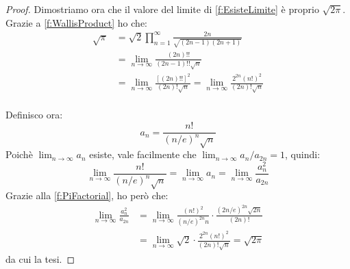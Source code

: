 \begin{proof}
	Dimostriamo ora che il valore del limite di \cref{f:EsisteLimite} è proprio $\sqrt{2\pi}$.
	Grazie a \cref{f:WallisProduct} ho che:
	\begin{equation}\label{f:PiFactorial}
	\begin{split}
		\sqrt{\pi}	& =\sqrt{2}\prod_{n=1}^\infty\frac{2n}{\sqrt{(2n-1)(2n+1)}}\\
					& =\lim_{n\to\infty}\frac{(2n)!!}{(2n-1)!!\sqrt{n}}\\
					& =\lim_{n\to\infty}\frac{\left[(2n)!!\right]^2}{(2n)!\sqrt{n}}=\lim_{n\to\infty}\frac{2^{2n}\left(n!\right)^2}{(2n)!\sqrt{n}}\\
	\end{split}
	\end{equation}
	
	Definisco ora:
	\begin{equation*}
		a_n=\frac{n!}{(n/e)^n\sqrt{n}}
	\end{equation*}
	Poichè $\lim_{n\to\infty}{a_n}$ esiste, vale facilmente che $\lim_{n\to\infty}a_n/a_{2n}=1$, quindi:
	\begin{equation*}
		\lim_{n\to\infty}{\frac{n!}{(n/e)^n\sqrt{n}}}=\lim_{n\to\infty}{a_n}=\lim_{n\to\infty}{\frac{a_n^2}{a_{2n}}}
	\end{equation*}
	Grazie alla \cref{f:PiFactorial}, ho però che:
	\begin{equation*}
	\begin{split}
		\lim_{n\to\infty}{\frac{a_n^2}{a_{2n}}}
		&=\lim_{n\to\infty}{\frac{\left(n!\right)^2}{(n/e)^{2n}n}\cdot \frac{(2n/e)^{2n}\sqrt{2n}}{(2n)!} }\\
		&=\lim_{n\to\infty}{\sqrt{2}\cdot\frac{2^{2n} \left(n!\right)^2}{(2n)!\sqrt{n}} }=\sqrt{2\pi}
	\end{split}
	\end{equation*}
	da cui la tesi.
\end{proof}
